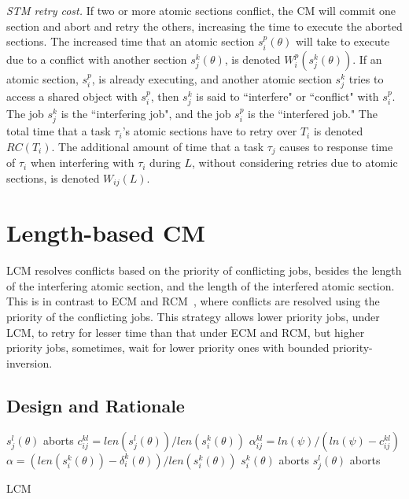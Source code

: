 \documentclass[letter]{sig-alternate}
\begin{document}
\textit{STM retry cost.} If two or more atomic sections conflict, the CM will commit one section and abort and retry the others, increasing the time to execute the aborted sections. The increased time that an atomic section $s_i^p (\theta)$ will take to execute due to a conflict with another section $s_j^k (\theta)$, is denoted $W_{i}^{p}(s_{j}^{k}(\theta))$. If an atomic section, $s_i^p$, is already executing, and another atomic section $s_j^k$ tries to access a shared object with $s_i^p$, then $s_j^k$ is said to ``interfere" or ``conflict" with $s_i^p$. The job $s_j^k$ is the ``interfering job", and the job $s_i^p$ is the ``interfered job."  
The total time that a task $\tau_i$'s atomic sections have to retry over $T_i$ is denoted $RC(T_i)$.
The additional amount of time that a task $\tau_j$ causes to response time of $\tau_i$ 
when interfering with $\tau_i$ during $L$, without considering retries due to atomic sections, is denoted $W_{ij}(L)$.

\section{Length-based CM}

LCM resolves conflicts based on the priority of conflicting jobs, besides the length of the interfering atomic section, and the length of the interfered atomic section. This is in contrast to ECM and RCM~\cite{stmconcurrencycontrol:emsoft11}, where conflicts are resolved using the priority of the conflicting jobs. This strategy allows lower priority jobs, under LCM, to retry for lesser time than that under ECM and RCM, but higher priority jobs, sometimes, wait for lower priority ones with bounded priority-inversion.

\subsection{\label{sec 9.1} Design and Rationale}

\begin{algorithm}
\footnotesize{
\LinesNumbered
{}
	{$s_j^l(\theta)$ aborts\label{step_sicommits}\;}
	{$c_{ij}^{kl}=len(s_j^l(\theta))/len(s_i^k(\theta))$\label{step_cijkl}\;
	$\alpha_{ij}^{kl}=ln(\psi)/(ln(\psi)-c_{ij}^{kl})$\label{step_alphaijkl}\;
	$\alpha=\left(len(s_i^k(\theta))-\delta_i^k(\theta)\right)/len(s_i^k(\theta))$\;
	{$s_i^k(\theta)$ aborts\label{step_siaborts}\;}
	{$s_j^l(\theta)$ aborts\label{step_sjaborts}\;}
	}
	}
\caption{LCM}
\label{alg_lcm}
\end{algorithm}
\end{document}
